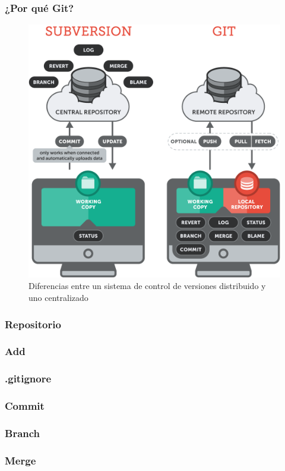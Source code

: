 \documentclass{beamer}
\begin{document}
\begin{frame}
\frametitle{¿Por qué Git?}
\begin{figure}
  \centering
  \includegraphics[scale=0.2]{centralizado-vs-distribuido}
  \caption{Diferencias entre un sistema de control de versiones distribuido y uno centralizado}
\end{figure}
\end{frame}

\begin{frame}
\frametitle{Repositorio}
\end{frame}

\begin{frame}
\frametitle{Add}
\end{frame}

\begin{frame}
\frametitle{.gitignore}
\end{frame}

\begin{frame}
\frametitle{Commit}
\end{frame}

\begin{frame}
\frametitle{Branch}
\end{frame}

\begin{frame}
\frametitle{Merge}
\end{frame}
\end{document}
